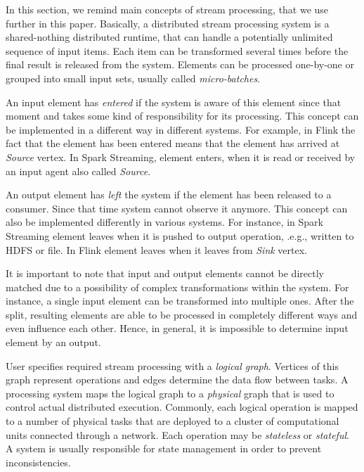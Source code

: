 In this section, we remind main concepts of stream processing, that we use further in this paper. Basically, a distributed stream processing system is a shared-nothing distributed runtime, that can handle a potentially unlimited sequence of input items. Each item can be transformed several times before the final result is released from the system. Elements can be processed one-by-one or grouped into small input sets, usually called {\em micro-batches}. 

An input element has {\em entered} if the system is aware of this element since that moment and takes some kind of responsibility for its processing. This concept can be implemented in a different way in different systems. For example, in Flink the fact that the element has been entered means that the element has arrived at {\em Source} vertex. In Spark Streaming, element enters, when it is read or received by an input agent also called {\em Source}. 

An output element has {\em left} the system if the element has been released to a consumer. Since that time system cannot observe it anymore. This concept can also be implemented differently in various systems. For instance, in Spark Streaming element leaves when it is pushed to output operation, .e.g., written to HDFS or file. In Flink element leaves when it leaves from {\em Sink} vertex.   

It is important to note that input and output elements cannot be directly matched due to a possibility of complex transformations within the system. For instance, a single input element can be transformed into multiple ones. After the split, resulting elements are able to be processed in completely different ways and even influence each other. Hence, in general, it is impossible to determine input element by an output.

User specifies required stream processing with a {\em logical graph}. Vertices of this graph represent operations and edges determine the data flow between tasks. A processing system maps the logical graph to a {\em physical} graph that is used to control actual distributed execution. Commonly, each logical operation is mapped to a number of physical tasks that are deployed to a cluster of computational units connected through a network. Each operation may be {\em stateless} or {\em stateful}. A system is usually responsible for state management in order to prevent inconsistencies.


